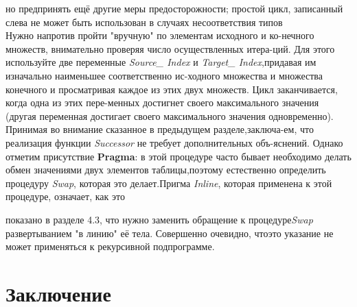 \noindent но предпринять ещё другие меры предосторожности; простой цикл, записанный слева не может быть использован в случаях несоответствия типов \\
\hspace*{15pt}Нужно напротив пройти "вручную" по элементам исходного и ко-\linebreak нечного множеств, внимательно проверяя число осуществленных итера-\linebreak ций. Для этого используйте две переменные \textit{Source\_ Index} и \textit{Target\_ Index},\linebreak придавая им изначально наименьшее соответственно ис-\linebreak ходного множества и множества конечного и просматривая каждое из \linebreak этих двух множеств. Цикл заканчивается, когда одна из этих пере-\linebreak менных достигнет своего максимального значения (другая переменная \linebreak достигает своего максимального значения одновременно).\newline 
\hspace*{15pt}Принимая во внимание сказанное в предыдущем разделе,заключа-\linebreak ем, что реализация функции \textit{Successor} не требует дополнительных объ-\linebreak яснений. Однако отметим присутствие \textbf{Pragma}: в этой процедуре часто \linebreak бывает необходимо делать обмен значениями двух элементов таблицы,\linebreak поэтому естественно определить процедуру \textit{Swap}, которая это делает.\linebreak Пригма \textit{Inline}, которая применена к этой процедуре, означает, как это \newline 
\newpage

\noindent показано в разделе 4.3, что нужно заменить обращение к процедуре\linebreak \textit{Swap} развертыванием "в линию" её тела. Совершенно очевидно, что\linebreak это указание не может применяться к рекурсивной подпрограмме. 

\section{Заключение}

